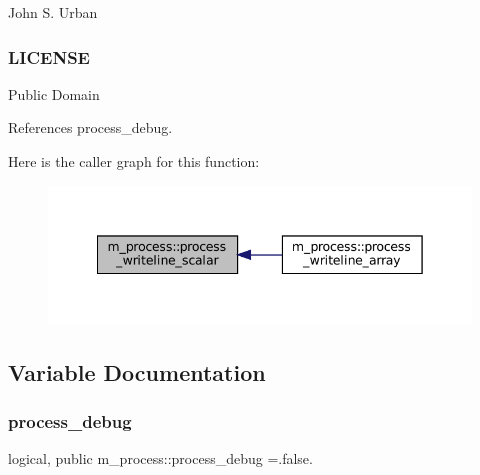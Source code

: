John S. Urban \subsubsection*{L\+I\+C\+E\+N\+SE}

Public Domain 

References process\+\_\+debug.

Here is the caller graph for this function\+:\nopagebreak
\begin{figure}[H]
\begin{center}
\leavevmode
\includegraphics[width=342pt]{namespacem__process_a72527c0ec0af26dcb14b8bfad6dcd482_icgraph}
\end{center}
\end{figure}


\subsection{Variable Documentation}
\mbox{\label{namespacem__process_a0fabee8d01338d5523fbdea5c5f1e894}} 
\subsubsection{\texorpdfstring{process\+\_\+debug}{process\_debug}}
{\footnotesize\ttfamily logical, public m\+\_\+process\+::process\+\_\+debug =.false.}

